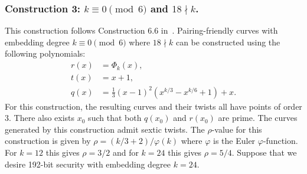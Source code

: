 
\subsubsection{Construction 3: $k \equiv 0 \pmod{6}$ and $18 \nmid k$.}
\label{con3}

This construction follows {Construction 6.6} in~\cite{2010/freeman}.
Pairing-friendly curves with embedding degree $k \equiv 0 \pmod{6}$ where $18 \nmid k$
can be constructed using the following polynomials:
\begin{align*}
r(x) &= \Phi_k(x),	\\
t(x) &= x+1,		\\
q(x) &= \frac{1}{3} (x-1)^2 (x^{k/3} - x^{k/6} + 1) + x.
\end{align*}
For this construction,
the resulting curves and their twists all have points of order 3.
There also exists $x_0$ such that both $q(x_0)$ and $r(x_0)$ are prime.
The curves generated by this construction admit sextic twists.
The $\rho$-value for this construction is given by $\rho = (k/3+2)/\varphi(k)$
where $\varphi$ is the Euler $\varphi$-function.
For $k=12$ this gives $\rho = 3/2$ and for $k=24$ this gives $\rho = 5/4$.
Suppose that we desire 192-bit security with embedding degree $k=24$.


